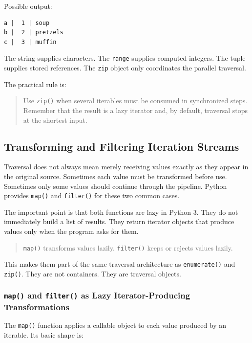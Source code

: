 \documentclass[a4paper,twoside]{report}
\begin{document}
Possible output:

\begin{verbatim}
a |  1 | soup
b |  2 | pretzels
c |  3 | muffin
\end{verbatim}

The string supplies characters. The \texttt{range} supplies computed integers. The tuple supplies stored references. The \texttt{zip} object only coordinates the parallel traversal.

The practical rule is:

\begin{quote}
Use \texttt{zip()} when several iterables must be consumed in synchronized steps. Remember that the result is a lazy iterator and, by default, traversal stops at the shortest input.
\end{quote}

\subsection{Transforming and Filtering Iteration Streams}

Traversal does not always mean merely receiving values exactly as they appear in the original source. Sometimes each value must be transformed before use. Sometimes only some values should continue through the pipeline. Python provides \texttt{map()} and \texttt{filter()} for these two common cases.

The important point is that both functions are lazy in Python 3. They do not immediately build a list of results. They return iterator objects that produce values only when the program asks for them.

\begin{quote}
\texttt{map()} transforms values lazily. \texttt{filter()} keeps or rejects values lazily.
\end{quote}

This makes them part of the same traversal architecture as \texttt{enumerate()} and \texttt{zip()}. They are not containers. They are traversal objects.

\subsubsection{\texttt{map()} and \texttt{filter()} as Lazy Iterator-Producing Transformations}

The \texttt{map()} function applies a callable object to each value produced by an iterable. Its basic shape is:
\end{document}
